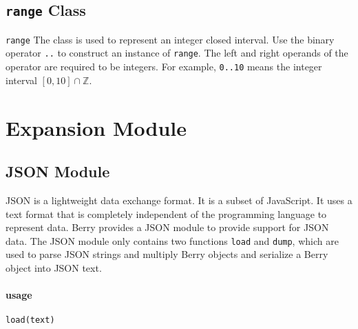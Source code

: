 \subsection{\texttt{range} Class}

\texttt{range} The class is used to represent an integer closed interval. Use the binary operator \texttt{..} to construct an instance of \texttt{range}. The left and right operands of the operator are required to be integers. For example, \texttt{0..10} means the integer interval $[0,10]\cap\mathbb{Z}$.

\section {Expansion Module}
\subsection {JSON Module}

JSON is a lightweight data exchange format. It is a subset of JavaScript. It uses a text format that is completely independent of the programming language to represent data. Berry provides a JSON module to provide support for JSON data. The JSON module only contains two functions \texttt{load} and \texttt{dump}, which are used to parse JSON strings and multiply Berry objects and serialize a Berry object into JSON text.


\paragraph{usage}
\begin{lstlisting}[language=berry, numbers=none]
load(text)
\end{lstlisting}

